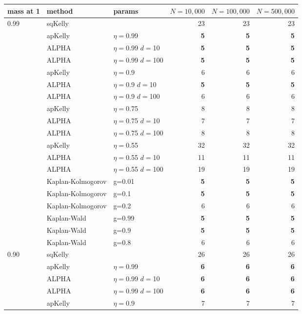\documentclass[12pt,runningheads]{llncs}
\begin{document}
{\begin{table}
\centering
\tiny
\begin{tabular}{lll|rrr} 
 mass at 1 & method & params & $N=10{,}000$ &  $N=100{,}000$ & $N=500{,}000$  \\
\hline 0.99 & sqKelly & & 23  & 23  & 23  \\
\cline{2-6} & apKelly & $\eta=$0.99 & \bf{5}  & \bf{5}  & \bf{5}  \\
\cline{2-6}
& ALPHA & $\eta=$0.99 $d=$10 & \bf{5}  & \bf{5}  & \bf{5}  \\
& ALPHA & $\eta=$0.99 $d=$100 & \bf{5}  & \bf{5}  & \bf{5}  \\
\cline{2-6} & apKelly & $\eta=$0.9 & 6  & 6  & 6  \\
\cline{2-6}
& ALPHA & $\eta=$0.9 $d=$10 & \bf{5}  & \bf{5}  & \bf{5}  \\
& ALPHA & $\eta=$0.9 $d=$100 & 6  & 6  & 6  \\
\cline{2-6} & apKelly & $\eta=$0.75 & 8  & 8  & 8  \\
\cline{2-6}
& ALPHA & $\eta=$0.75 $d=$10 & 7  & 7  & 7  \\
& ALPHA & $\eta=$0.75 $d=$100 & 8  & 8  & 8  \\
\cline{2-6} & apKelly & $\eta=$0.55 & 32  & 32  & 32  \\
\cline{2-6}
& ALPHA & $\eta=$0.55 $d=$10 & 11  & 11  & 11  \\
& ALPHA & $\eta=$0.55 $d=$100 & 19  & 19  & 19  \\
\cline{2-6}
 & Kaplan-Kolmogorov & g=0.01 & \bf{5}  & \bf{5}  & \bf{5}  \\
 & Kaplan-Kolmogorov & g=0.1 & \bf{5}  & \bf{5}  & \bf{5}  \\
 & Kaplan-Kolmogorov & g=0.2 & 6  & 6  & 6  \\
\cline{2-6}
 & Kaplan-Wald & g=0.99 & \bf{5}  & \bf{5}  & \bf{5}  \\
 & Kaplan-Wald & g=0.9 & \bf{5}  & \bf{5}  & \bf{5}  \\
 & Kaplan-Wald & g=0.8 & 6  & 6  & 6  \\
\hline 0.90 & sqKelly & & 26  & 26  & 26  \\
\cline{2-6} & apKelly & $\eta=$0.99 & \bf{6}  & \bf{6}  & \bf{6}  \\
\cline{2-6}
& ALPHA & $\eta=$0.99 $d=$10 & \bf{6}  & \bf{6}  & \bf{6}  \\
& ALPHA & $\eta=$0.99 $d=$100 & \bf{6}  & \bf{6}  & \bf{6}  \\
\cline{2-6} & apKelly & $\eta=$0.9 & 7  & 7  & 7  \\

\end{tabular}
\end{table}}
\end{document}
